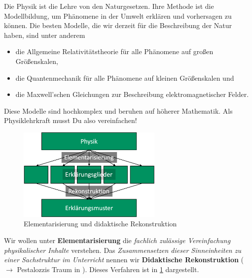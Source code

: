 Die Physik ist die Lehre von den Naturgesetzen. Ihre Methode ist die Modellbildung, um Phänomene in der Umwelt erklären und vorhersagen zu können. Die besten Modelle, die wir derzeit für die Beschreibung der Natur haben, sind unter anderem
\begin{itemize}
	\item die Allgemeine Relativitätstheorie für alle Phänomene auf großen Größenskalen,
	\item die Quantenmechanik für alle Phänomene auf kleinen Größenskalen und
	\item die Maxwell'schen Gleichungen zur Beschreibung elektromagnetischer Felder.
\end{itemize}
Diese Modelle sind hochkomplex und beruhen auf höherer Mathematik. Als Physiklehrkraft musst Du also vereinfachen!

\begin{figure}[ht b]
	\centering
	\includegraphics[width=7cm]{Bilder/elementarisierung}
	\caption{Elementarisierung und didaktische Rekonstruktion}\label{fig:elementarisierung}
\end{figure}

Wir wollen unter \textbf{Elementarisierung} die \emph{fachlich zulässige Vereinfachung physikalischer Inhalte} verstehen. Das \emph{Zusammensetzen dieser Sinneinheiten zu einer Sachstruktur im Unterricht} nennen wir \textbf{Didaktische Rekonstruktion} ($\to$ Pestalozzis Traum in \cite[S. 158 f.]{KircherGirwidzHaussler1}). Dieses Verfahren ist in \cref{fig:elementarisierung} dargestellt.
\vfill

